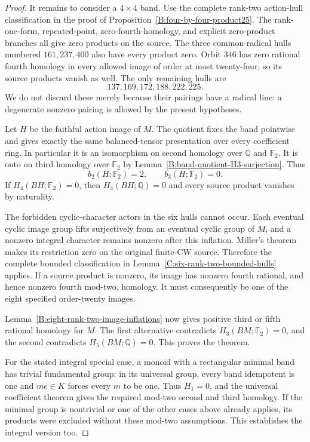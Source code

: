 \begin{proof}
It remains to consider a $4\times4$ band. Use the complete
rank-two action-hull classification in the proof of
Proposition~\ref{B:four-by-four-product25}. The rank-one-form,
repeated-point, zero-fourth-homology, and explicit zero-product
branches all give zero products on the source. The three
common-radical hulls numbered $161,237,400$ also have every
product zero. Orbit $346$ has zero rational fourth homology in
every allowed image of order at most twenty-four, so its source
products vanish as well. The only remaining hulls are
\[
 137,169,172,188,222,225.
\]
We do not discard these merely because their pairings have a
radical line: a degenerate nonzero pairing is allowed by the
present hypotheses.

Let $H$ be the faithful action image of $M$. The quotient fixes
the band pointwise and gives exactly the same balanced-tensor
presentation over every coefficient ring. In particular it is
an isomorphism on second homology over $\mathbb Q$ and
$\mathbb F_2$. It is onto on third homology over $\mathbb F_2$
by Lemma~\ref{B:band-quotient-H3-surjection}. Thus
\[
 b_2(H;\mathbb F_2)=2,\qquad b_3(H;\mathbb F_2)=0.
\]
If $H_4(BH;\mathbb F_2)=0$, then $H_4(BH;\mathbb Q)=0$ and
every source product vanishes by naturality.

The forbidden cyclic-character actors in the six hulls cannot
occur. Each eventual cyclic image group lifts surjectively from
an eventual cyclic group of $M$, and a nonzero integral character
remains nonzero after this inflation. Miller's theorem makes
its restriction zero on the original finite-CW source. Therefore
the complete bounded classification in
Lemma~\ref{C:six-rank-two-bounded-hulls} applies. If a source
product is nonzero, its image has nonzero fourth rational,
and hence nonzero fourth mod-two, homology. It must consequently
be one of the eight specified order-twenty images.

Lemma~\ref{B:eight-rank-two-image-inflations} now gives positive
third or fifth rational homology for $M$. The first alternative
contradicts $H_3(BM;\mathbb F_2)=0$, and the second contradicts
$H_5(BM;\mathbb Q)=0$. This proves the theorem.

For the stated integral special case, a monoid with a rectangular
minimal band has trivial fundamental group: in its universal
group, every band idempotent is one and $me\in K$ forces every
$m$ to be one. Thus $H_1=0$, and the universal coefficient theorem
gives the required mod-two second and third homology. If the
minimal group is nontrivial or one of the other cases above
already applies, its products were excluded without these
mod-two assumptions. This establishes the integral version too.
\end{proof}

